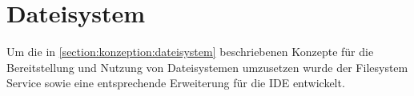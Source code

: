 \section{Dateisystem}\label{section:prototypische-implementierung:dateisystem}


Um die in \autoref{section:konzeption:dateisystem} beschriebenen Konzepte für die Bereitstellung und Nutzung von Dateisystemen umzusetzen wurde der Filesystem Service sowie eine entsprechende Erweiterung für die IDE entwickelt.

